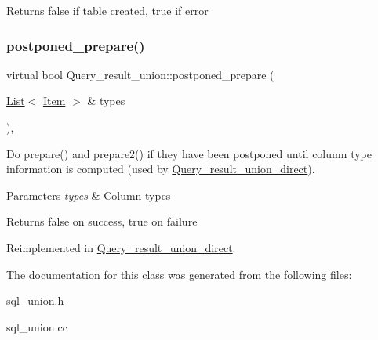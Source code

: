 \begin{DoxyReturn}{Returns}
false if table created, true if error 
\end{DoxyReturn}
\mbox{\label{classQuery__result__union_ad110a83be28d4f91cfd4c7c534defcc9}} 
\subsubsection{\texorpdfstring{postponed\+\_\+prepare()}{postponed\_prepare()}}
{\footnotesize\ttfamily virtual bool Query\+\_\+result\+\_\+union\+::postponed\+\_\+prepare (\begin{DoxyParamCaption}\item[{\mbox{\hyperlink{classList}{List}}$<$ \mbox{\hyperlink{classItem}{Item}} $>$ \&}]{types }\end{DoxyParamCaption})\hspace{0.3cm}{\ttfamily [inline]}, {\ttfamily [virtual]}}

Do prepare() and prepare2() if they have been postponed until column type information is computed (used by \mbox{\hyperlink{classQuery__result__union__direct}{Query\+\_\+result\+\_\+union\+\_\+direct}}).


\begin{DoxyParams}{Parameters}
{\em types} & Column types\\
\hline
\end{DoxyParams}
\begin{DoxyReturn}{Returns}
false on success, true on failure 
\end{DoxyReturn}


Reimplemented in \mbox{\hyperlink{classQuery__result__union__direct_af8c3f38e8a9597784871d3d9a6d5839a}{Query\+\_\+result\+\_\+union\+\_\+direct}}.



The documentation for this class was generated from the following files\+:\begin{DoxyCompactItemize}
\item 
sql\+\_\+union.\+h\item 
sql\+\_\+union.\+cc\end{DoxyCompactItemize}
